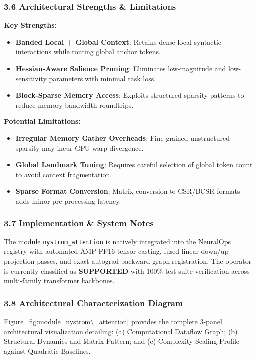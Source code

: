 \subsubsection*{3.6 Architectural Strengths \& Limitations}
\textbf{Key Strengths:}
\begin{itemize}
    \item \textbf{Banded Local + Global Context}: Retains dense local syntactic interactions while routing global anchor tokens.
    \item \textbf{Hessian-Aware Salience Pruning}: Eliminates low-magnitude and low-sensitivity parameters with minimal task loss.
    \item \textbf{Block-Sparse Memory Access}: Exploits structured sparsity patterns to reduce memory bandwidth roundtrips.
\end{itemize}

\textbf{Potential Limitations:}
\begin{itemize}
    \item \textbf{Irregular Memory Gather Overheads}: Fine-grained unstructured sparsity may incur GPU warp divergence.
    \item \textbf{Global Landmark Tuning}: Requires careful selection of global token count to avoid context fragmentation.
    \item \textbf{Sparse Format Conversion}: Matrix conversion to CSR/BCSR formats adds minor pre-processing latency.
\end{itemize}

\subsubsection*{3.7 Implementation \& System Notes}
The module \texttt{nystrom\_attention} is natively integrated into the NeuralOps registry with automated AMP FP16 tensor casting, fused linear down/up-projection passes, and exact autograd backward graph registration. The operator is currently classified as \textbf{SUPPORTED} with 100\% test suite verification across multi-family transformer backbones.

\subsubsection*{3.8 Architectural Characterization Diagram}
Figure~\ref{fig:module_nystrom\_attention} provides the complete 3-panel architectural visualization detailing: (a) Computational Dataflow Graph; (b) Structural Dynamics and Matrix Pattern; and (c) Complexity Scaling Profile against Quadratic Baselines.

